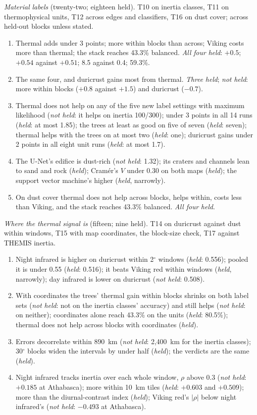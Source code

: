 \documentclass[twocolumn]{aastex701}
\begin{document}
\emph{Material labels} (twenty-two; eighteen held). T10 on inertia classes, T11 on thermophysical units, T12 across
edges and classifiers, T16 on dust cover; across held-out blocks unless stated.
\begin{enumerate}
\item[T10] Thermal adds under 3 points; more within blocks than across; Viking costs more than thermal; the stack
reaches 43.3\% balanced. \emph{All four held}: $+0.5$; $+0.54$ against $+0.51$; 8.5 against 0.4; 59.3\%.
\item[T11] The same four, and duricrust gains most from thermal. \emph{Three held}; \emph{not held}: more within
blocks ($+0.8$ against $+1.5$) and duricrust ($-0.7$).
\item[T12] Thermal does not help on any of the five new label settings with maximum likelihood (\emph{not held}: it
helps on inertia 100/300); under 3 points in all 14 runs (\emph{held}: at most 1.85); the trees at least as good on
five of seven (\emph{held}: seven); thermal helps with the trees on at most two (\emph{held}: one); duricrust gains
under 2 points in all eight unit runs (\emph{held}: at most 1.7).
\item[T13] The U-Net's edifice is dust-rich (\emph{not held}: 1.32); its craters and channels lean to sand and rock
(\emph{held}); Cram\'er's $V$ under 0.30 on both maps (\emph{held}); the support vector machine's higher
(\emph{held}, narrowly).
\item[T16] On dust cover thermal does not help across blocks, helps within, costs less than Viking, and the stack
reaches 43.3\% balanced. \emph{All four held}.
\end{enumerate}

\emph{Where the thermal signal is} (fifteen; nine held). T14 on duricrust against dust within windows, T15 with map
coordinates, the block-size check, T17 against THEMIS inertia.
\begin{enumerate}
\item[T14] Night infrared is higher on duricrust within 2$^{\circ}$ windows (\emph{held}: 0.556); pooled it is under
0.55 (\emph{held}: 0.516); it beats Viking red within windows (\emph{held}, narrowly); day infrared is lower on
duricrust (\emph{not held}: 0.508).
\item[T15] With coordinates the trees' thermal gain within blocks shrinks on both label sets (\emph{not held}: not on the
inertia classes' accuracy) and still helps (\emph{not held}: on neither); coordinates alone reach 43.3\% on the units
(\emph{held}: 80.5\%); thermal does not help across blocks with coordinates (\emph{held}).
\item[B] Errors decorrelate within 890~km (\emph{not held}: 2,400~km for the inertia classes); 30$^{\circ}$ blocks
widen the intervals by under half (\emph{held}); the verdicts are the same (\emph{held}).
\item[T17] Night infrared tracks inertia over each whole window, $\rho$ above 0.3 (\emph{not held}: $+0.185$ at
Athabasca); more within 10~km tiles (\emph{held}: $+0.603$ and $+0.509$); more than the diurnal-contrast index
(\emph{held}); Viking red's $|\rho|$ below night infrared's (\emph{not held}: $-0.493$ at Athabasca).
\end{enumerate}
\end{document}
